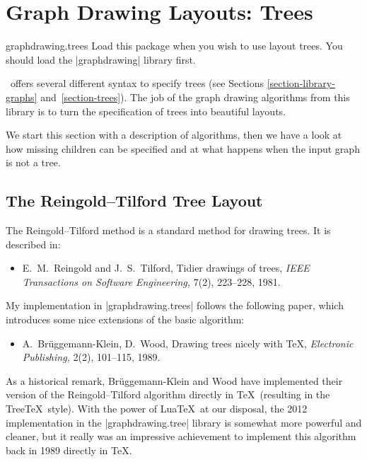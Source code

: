%
%
%

\section{Graph Drawing Layouts: Trees}
\label{section-first-graphdrawing-library-in-manual}
\label{section-library-graphdrawing-trees}

{}

\begin{tikzlibrary}{graphdrawing.trees}
  Load this package when you wish to use layout trees. You should load
  the |graphdrawing| library first. 
\end{tikzlibrary}


\tikzname\ offers several different syntax to specify trees (see
Sections \ref{section-library-graphs}
and~\ref{section-trees}). The job of the graph drawing algorithms from
this library is to turn the specification of trees into beautiful
layouts. 

We start this section with a description of algorithms, then we have a
look at how missing children can be specified and at what happens when
the input graph is not a tree.


\subsection{The Reingold--Tilford Tree Layout}

The Reingold--Tilford method is a standard method for drawing
trees. It is described in:
\begin{itemize}
\item
  E.~M.\ Reingold and J.~S.\ Tilford,
  \newblock Tidier drawings of trees,
  \newblock \emph{IEEE Transactions on Software Engineering,}
  7(2), 223--228, 1981.
\end{itemize}
My implementation in |graphdrawing.trees| follows the following paper, which
introduces some nice extensions of the basic algorithm:
\begin{itemize}
\item
  A.\ Br\"uggemann-Klein, D.\ Wood,
  \newblock Drawing trees nicely with \TeX,
  \emph{Electronic Publishing,} 2(2), 101--115, 1989.
\end{itemize}
As a historical remark, Br\"uggemann-Klein and Wood have implemented
their version of the Reingold--Tilford algorithm directly in \TeX\
(resulting in the Tree\TeX\ style). With the power of Lua\TeX\ at
our disposal, the 2012 implementation in the |graphdrawing.tree|
library is somewhat more powerful and cleaner, but it really was an
impressive achievement to implement this algorithm back in 1989
directly in \TeX. 


